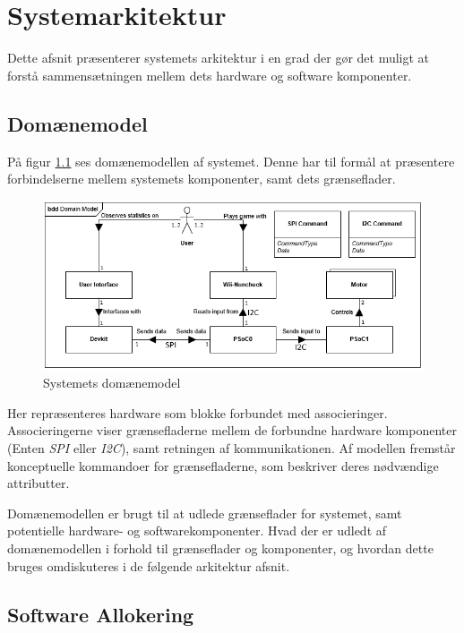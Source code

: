 \chapter{Systemarkitektur}

Dette afsnit præsenterer systemets arkitektur i en grad der gør det muligt at forstå sammensætningen mellem dets hardware og software komponenter.

\section{Domænemodel}

På figur \ref{figure:domainModel} ses domænemodellen af systemet. Denne har til formål at præsentere forbindelserne mellem systemets komponenter, samt dets grænseflader.

\begin{figure}[H]
	\centering
	\includegraphics[width=\textwidth]{SystemArkitektur/images/DomainModel.PNG}
	\caption{Systemets domænemodel}
	\label{figure:domainModel}
\end{figure}

Her repræsenteres hardware som blokke forbundet med associeringer. Associeringerne viser grænsefladerne mellem de forbundne hardware komponenter (Enten \textit{SPI} eller \textit{I2C}), samt retningen af kommunikationen. Af modellen fremstår konceptuelle kommandoer for grænsefladerne, som beskriver deres nødvændige attributter.

Domænemodellen er brugt til at udlede grænseflader for systemet, samt potentielle hardware- og softwarekomponenter. Hvad der er udledt af domænemodellen i forhold til grænseflader og komponenter, og hvordan dette bruges omdiskuteres i de følgende arkitektur afsnit.

\section{Software Allokering}
\label{afsnit:SoftwareAllokering}

